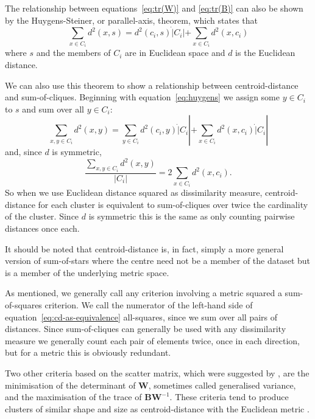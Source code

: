 \documentclass[a4paper]{report}
\begin{document}
The relationship between equations~\eqref{eq:tr(W)} and \eqref{eq:tr(B)} can
also be shown by the Huygens-Steiner, or parallel-axis, theorem, which states
that
\begin{equation}
  \label{eq:huygens}
  \sum_{x \in C_i} d^2(x,s) = d^2(c_i,s) \dot |C_i| + \sum_{x \in C_i} d^2(x,c_i)
\end{equation}
where $s$ and the members of $C_i$ are in Euclidean space and $d$ is the
Euclidean distance.

We can also use this theorem to show a relationship between centroid-distance
and sum-of-cliques.  Beginning with equation~\eqref{eq:huygens} we assign some
$y \in C_i$ to $s$ and sum over all $y \in C_i$:
\begin{equation*}
  \sum_{x,y \in C_i} d^2(x,y) = \sum_{y \in C_i} d^2(c_i,y) \dot |C_i|
                           + \sum_{x \in C_i} d^2(x,c_i) \dot |C_i|
\end{equation*}
and, since $d$ is symmetric,
\begin{equation}
  \label{eq:cd-as-equivalence}
  \frac{\displaystyle \sum_{x,y \in C_i} d^2(x,y)}
       {|C_i|}
  = 2 \sum_{x \in C_i} d^2(x,c_i).
\end{equation}
So when we use Euclidean distance squared as dissimilarity measure,
centroid-distance for each cluster is equivalent to sum-of-cliques over twice
the cardinality of the cluster.  Since $d$ is symmetric this is the same as
only counting pairwise distances once each.

It should be noted that centroid-distance is, in fact, simply a more general
version of sum-of-stars where the centre need not be a member of the dataset
but is a member of the underlying metric space.

As mentioned, we generally call any criterion involving a metric squared a
sum-of-squares criterion.  We call the numerator of the left-hand side of
equation~\eqref{eq:cd-as-equivalence} all-squares, since we sum over all pairs
of distances.  Since sum-of-cliques can generally be used with any
dissimilarity measure we generally count each pair of elements twice, once in
each direction, but for a metric this is obviously redundant.

Two other criteria based on the scatter matrix, which were suggested by
\citet{friedman1967criteria}, are the minimisation of the determinant of
$\mathbf{W}$, sometimes called generalised variance, and the maximisation of
the trace of $\mathbf{BW}^{-1}$.  These criteria tend to produce clusters of
similar shape and size as centroid-distance with the Euclidean metric
\citep{marriott1982optimization}.
\end{document}
